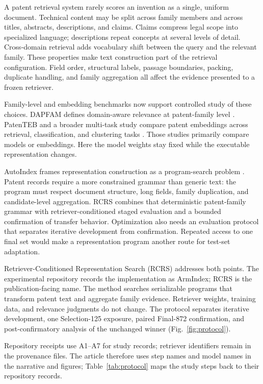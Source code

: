 \documentclass[final,5p,times,twocolumn]{elsarticle}
\newcommand{\RCRS}{RCRS}
\begin{document}
A patent retrieval system rarely scores an invention as a single, uniform
document. Technical content may be split across family members and across
titles, abstracts, descriptions, and claims. Claims compress legal scope into
specialized language; descriptions repeat concepts at several levels of
detail. Cross-domain retrieval adds vocabulary shift between the query and the
relevant family. These properties make text construction part of the retrieval
configuration. Field order, structural labels, passage boundaries, packing,
duplicate handling, and family aggregation all affect the evidence presented
to a frozen retriever.

Family-level and embedding benchmarks now support controlled study of these
choices. DAPFAM defines domain-aware relevance at patent-family level
\cite{dapfam2026}. PatenTEB and a broader multi-task study compare patent
embeddings across retrieval, classification, and clustering tasks
\cite{patenteb2025,patentembeddings2026}. Those studies primarily compare
models or embeddings. Here the model weights stay fixed while the executable
representation changes.

AutoIndex frames representation construction as a program-search problem
\cite{autoindex2026}. Patent records require a more constrained grammar than
generic text: the program must respect document structure, long fields,
family duplication, and candidate-level aggregation. RCRS combines that
deterministic patent-family grammar with retriever-conditioned staged
evaluation and a bounded confirmation of transfer behavior. Optimization also
needs an evaluation protocol that separates iterative development from
confirmation.
Repeated access to one final set would make a representation program another
route for test-set adaptation.

Retriever-Conditioned Representation Search (\RCRS{}) addresses both points.
The experimental repository records the implementation as ArmIndex; \RCRS{}
is the publication-facing name. The method searches serializable
programs that transform patent text and aggregate family evidence. Retriever
weights, training data, and relevance judgments do not change. The protocol
separates iterative development, one Selection-125 exposure, paired Final-872
confirmation, and post-confirmatory analysis of the unchanged winner
(Fig.~\ref{fig:protocol}).

Repository receipts use A1--A7 for study records; retriever identifiers remain
in the provenance files. The article therefore uses step names and model names
in the narrative and figures; Table~\ref{tab:protocol} maps the study steps back
to their repository records.
\end{document}

